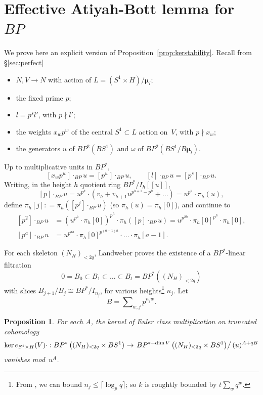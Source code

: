 \documentclass[11pt, reqno]{amsart}
\theoremstyle{plain}
\newtheorem{prop}[thm]{Proposition}
\theoremstyle{definition}
\DeclareMathOperator*{\gdot}{\cdot}
\begin{document}
\appendix 

\section{Effective Atiyah-Bott lemma for $BP$}

We prove here an explicit version of Proposition~\ref {prop:kerstability}. 
Recall from \S\ref {sec:perfect} 
\begin{itemize}\itemsep0ex
\item $N, V\to N$ with action of 
$L=(S^1\times H)/\boldsymbol{\mu}_l$;
\item the fixed prime $p$;
\item $l=p^sl'$, with $p\nmid l'$;
\item the weights $x_wp^w$ of the central $S^1\subset L$ 
action on~$V$, with $p\nmid x_w$; 
\item the generators $u$ of $BP^2(BS^1)$ and $\omega$ of $BP^2(BS^1/B\boldsymbol{\mu}_l)$.
\end{itemize}
Up to multiplicative units in $BP^*$,
\[
[x_wp^w]\gdot_{BP} u = [p^w]\gdot_{BP} u, \qquad 
	[l] \gdot_{BP} u = [p^s]\gdot_{BP} u.
\]
Writing, in the height $h$ quotient ring $BP^*/I_h[[u]]$, 
\[
[p]\gdot_{BP} u = u^{p^h}\cdot(v_h + v_{h+1}u^{p^{h+1}-p^{h}} + \dots) 
	= u^{p^h}\cdot \pi_h(u),
\]
define $\pi_h[j]: = \pi_h([p^{j}]\gdot_{BP} u)$ (so $\pi_h(u) =\pi_h[0]$), and continue to
\begin{equation}\label{eq:upowers}
\begin{split}
[p^2] \gdot_{BP} u &= \left(u^{p^h}\cdot \pi_h[0]\right)^{p^h} 	\cdot \pi_h\left([p]\gdot_{BP}u\right) = u^{p^{2h}}\cdot 
	\pi_h[0]^{p^h} \cdot \pi_h[0], \\
[p^a] \gdot_{BP} u &= u^{p^{ah}}\cdot \pi_h[0]^{p^{(a-1)h}} \cdot
	\dots \cdot \pi_h[a-1].
\end{split}
\end{equation}


For each skeleton $(N_H)_{< 2q}$, Landweber \cite{Landweber} proves the existence of a $BP^*$-linear filtration 
\[
0=B_0\subset B_1 \subset \dots \subset B_t = 
	BP^*\left((N_H)_{< 2q}\right)
\]
with slices $B_{j+1}/B_j \cong BP^*/I_{n_j}$, for various heights\footnote{From \cite{jw2}, we can bound 
$n_j \le \lceil \log_pq \rceil$; so $k$ is roughtly bounded by $t\sum_w q^w$.} $n_j$.
Let 
\[
B =\sum\nolimits_{w,j} p^{n_jw}.
\]

\begin{prop}
\label{prop:effective}
For each $A$, the kernel of Euler class multiplication on truncated cohomology
\[
\ker e_{S^1\times H}(V)\cdot: BP^*\left((N_H)_{< 2q}
	\times BS^1\right) \to \left.BP^{*+\dim V} 
	\left((N_H)_{< 2q}\times BS^1\right) \right/
	(u)^{A + qB} 
\] 
vanishes mod~$u^A$.
\end{prop}
\end{document}
